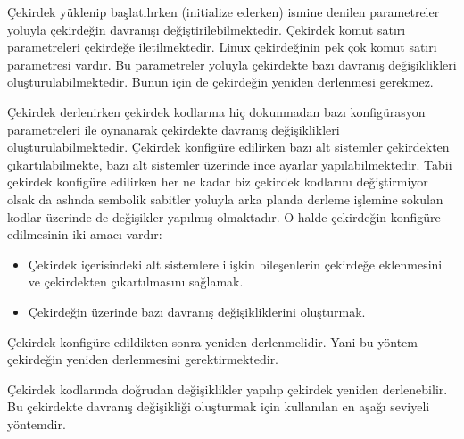 \documentclass[a4paper,10pt,turkish]{sphinxmanual}
\begin{document}
\sphinxAtStartPar
{}

\sphinxAtStartPar
Çekirdek yüklenip başlatılırken (initialize ederken) ismine  denilen parametreler yoluyla çekirdeğin davranışı
değiştirilebilmektedir. Çekirdek komut satırı parametreleri  çekirdeğe
iletilmektedir. Linux çekirdeğinin pek çok komut satırı parametresi vardır. Bu parametreler yoluyla
çekirdekte bazı davranış değişiklikleri oluşturulabilmektedir. Bunun için de çekirdeğin yeniden
derlenmesi gerekmez.

\sphinxAtStartPar
{}

\sphinxAtStartPar
Çekirdek derlenirken çekirdek kodlarına hiç dokunmadan bazı konfigürasyon parametreleri ile oynanarak
çekirdekte davranış değişiklikleri oluşturulabilmektedir. Çekirdek konfigüre edilirken bazı alt
sistemler çekirdekten çıkartılabilmekte, bazı alt sistemler üzerinde ince ayarlar yapılabilmektedir.
Tabii çekirdek konfigüre edilirken her ne kadar biz çekirdek kodlarını değiştirmiyor olsak da aslında
sembolik sabitler yoluyla arka planda derleme işlemine sokulan kodlar üzerinde de değişikler yapılmış
olmaktadır. O halde çekirdeğin konfigüre edilmesinin iki amacı vardır:
\begin{itemize}
\item {} 
\sphinxAtStartPar
Çekirdek içerisindeki alt sistemlere ilişkin bileşenlerin çekirdeğe eklenmesini ve çekirdekten
çıkartılmasını sağlamak.

\item {} 
\sphinxAtStartPar
Çekirdeğin üzerinde bazı davranış değişikliklerini oluşturmak.

\end{itemize}

\sphinxAtStartPar
Çekirdek konfigüre edildikten sonra yeniden derlenmelidir. Yani bu yöntem çekirdeğin yeniden
derlenmesini gerektirmektedir.

\sphinxAtStartPar
{}

\sphinxAtStartPar
Çekirdek kodlarında doğrudan değişiklikler yapılıp çekirdek yeniden derlenebilir. Bu çekirdekte
davranış değişikliği oluşturmak için kullanılan en aşağı seviyeli yöntemdir.

\sphinxAtStartPar
{}
\end{document}
